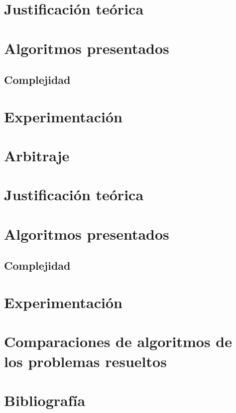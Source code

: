 \documentclass[8pt,a4paper]{article}
\begin{document}
\section{Justificación teórica}
\section{Algoritmos presentados}
\subsection{Complejidad}
\section{Experimentación}

\pagebreak

\section{Arbitraje}
\section{Justificación teórica}
\section{Algoritmos presentados}
\subsection{Complejidad}
\section{Experimentación}

\section{Comparaciones de algoritmos de los problemas resueltos}

\section{Bibliografía}
\end{document}
